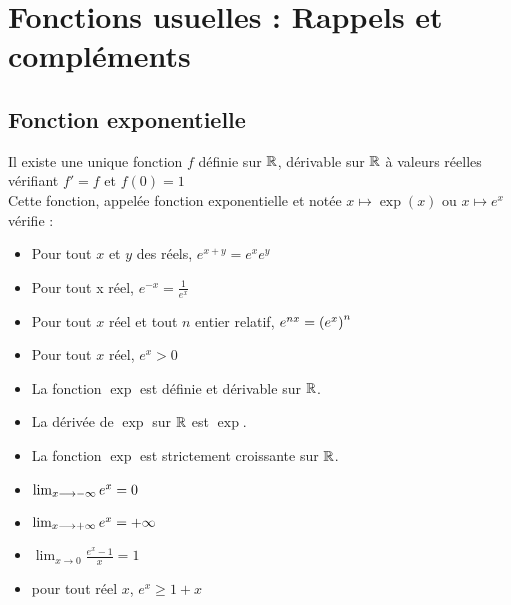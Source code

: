 \chapter{Fonctions usuelles : Rappels et compléments}

\minitoc
\section{Fonction exponentielle}
\begin{defprop}
	Il existe une unique fonction \(f\) définie sur \(\mathbb{R}\), dérivable sur \(\mathbb{R}\) à valeurs réelles vérifiant \(f' = f\) et \(f(0) = 1\) \\
	Cette fonction, appelée fonction exponentielle et notée \(x\mapsto \exp(x)\) ou \(x\mapsto e^x\) vérifie :
	\begin{itemize}
		\item Pour tout \(x\) et \(y\) des réels, \(e^{x+y}  =e^xe^y\)
		\item Pour tout x réel, \(e^{-x} = \frac{1}{e^x} \)
		\item Pour tout \(x\) réel et tout \(n\) entier relatif, \(e^{nx} = \left(e^x\right)^n\)
		\item Pour tout \(x\) réel, \(e^x >0\)
		\item La fonction \(\exp\) est définie et dérivable sur \(\mathbb{R}\).
		\item La dérivée de \(\exp\) sur \(\mathbb{R}\) est \(\exp\).
		\item La fonction \(\exp\) est strictement croissante sur \(\mathbb{R}\).
		\item \(\lim_{x\longrightarrow-\infty}e^x =0\)
		\item \(\lim_{x\longrightarrow+\infty} e^x = +\infty \)
		\item \(\lim_{x\to 0} \frac{e^x-1}{x} = 1\)
		\item pour tout réel \(x\), \(e^x\geq 1+x\)
	\end{itemize}
\end{defprop}

